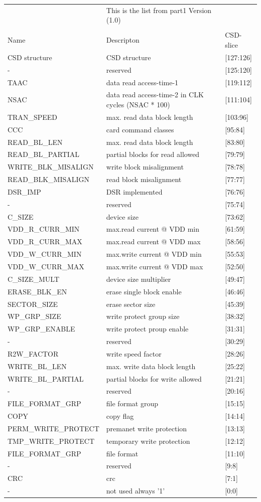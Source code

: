 \documentclass[]{article}
\begin{document}
\begin{tabular}{|l|l|l|}
	&This is the list from part1 Version (1.0)& \\
	&& \\
	Name &Descripton&CSD-slice \\
	CSD structure&CSD structure&[127:126] \\
	-&reserved&[125:120] \\
	TAAC&data read access-time-1&[119:112] \\
	NSAC&data read access-time-2 in CLK cycles (NSAC * 100)&[111:104] \\
	TRAN\_SPEED&max. read data block length&[103:96] \\
	CCC&card command classes&[95:84] \\
	READ\_BL\_LEN&max. read data block length&[83:80] \\
	READ\_BL\_PARTIAL&partial blocks for read allowed&[79:79] \\
	WRITE\_BLK\_MISALIGN&write block misalignment&[78:78] \\
	READ\_BLK\_MISALIGN&read block misalignment&[77:77] \\
	DSR\_IMP&DSR implemented&[76:76] \\
	-&reserved&[75:74] \\
	C\_SIZE&device size&[73:62] \\
	VDD\_R\_CURR\_MIN&max.read current @ VDD min&[61:59] \\
	VDD\_R\_CURR\_MAX&max.read current @ VDD max&[58:56] \\
	VDD\_W\_CURR\_MIN&max.write current @ VDD min&[55:53] \\
	VDD\_W\_CURR\_MAX&max.write current @ VDD max&[52:50] \\ 
	C\_SIZE\_MULT&device size multiplier&[49:47] \\
	ERASE\_BLK\_EN&erase single block enable&[46:46] \\
	SECTOR\_SIZE&erase sector size&[45:39] \\
	WP\_GRP\_SIZE&write protect group size&[38:32] \\
	WP\_GRP\_ENABLE&write protect proup enable&[31:31] \\
	-&reserved&[30:29] \\
	R2W\_FACTOR&write speed factor&[28:26]  \\
	WRITE\_BL\_LEN&max. write data block length&[25:22] \\
	WRITE\_BL\_PARTIAL&partial blocks for write allowed&[21:21] \\
	-&reserved&[20:16]  \\
	FILE\_FORMAT\_GRP&file format group&[15:15] \\
	COPY&copy flag&[14:14] \\
	PERM\_WRITE\_PROTECT&premanet write protection&[13:13] \\
	TMP\_WRITE\_PROTECT&temporary write protection&[12:12] \\
	FILE\_FORMAT\_GRP&file format&[11:10] \\
	-&reserved&[9:8] \\
	CRC&crc&[7:1] \\
	-&not used always '1'&[0:0] \\
\end{tabular}
\end{document}
